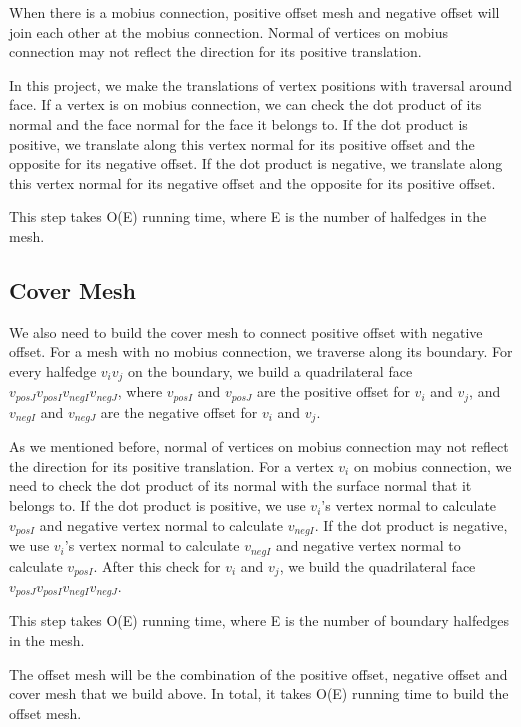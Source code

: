 \documentclass[12pt]{article}
\begin{document}
When there is a mobius connection, positive offset mesh and negative offset will join each other at the mobius connection. Normal of vertices on mobius connection may not reflect the direction for its positive translation. 

In this project, we make the translations of vertex positions with traversal around face. If a vertex is on mobius connection, we can check the dot product of its normal and the face normal for the face it belongs to. If the dot product is positive, we translate along this vertex normal for its positive offset and the opposite for its negative offset. If the dot product is negative, we translate along this vertex normal for its negative offset and the opposite for its positive offset.

This step takes O(E) running time, where E is the number of halfedges in the mesh.

\subsection{Cover Mesh}

We also need to build the cover mesh to connect positive offset with negative offset. For a mesh with no mobius connection, we traverse along its boundary. For every halfedge $v_iv_j$ on the boundary, we build a quadrilateral face $v_{posJ}v_{posI}v_{negI}v_{negJ}$, where $v_{posI}$ and $v_{posJ}$ are the positive offset for $v_i$ and $v_j$, and $v_{negI}$ and $v_{negJ}$ are the negative offset for $v_i$ and $v_j$.

As we mentioned before, normal of vertices on mobius connection may not reflect the direction for its positive translation. For a vertex $v_i$ on mobius connection, we need to check the dot product of its normal with the surface normal that it belongs to. If the dot product is positive, we use $v_i$'s vertex normal to calculate $v_{posI}$ and negative vertex normal to calculate $v_{negI}$. If the dot product is negative, we use $v_i$'s vertex normal to calculate $v_{negI}$ and negative vertex normal to calculate $v_{posI}$. After this check for $v_i$ and $v_j$, we build the quadrilateral face $v_{posJ}v_{posI}v_{negI}v_{negJ}$.

This step takes O(E) running time, where E is the number of boundary halfedges in the mesh.

The offset mesh will be the combination of the positive offset, negative offset and cover mesh that we build above. In total, it takes O(E) running time to build the offset mesh.
\end{document}
